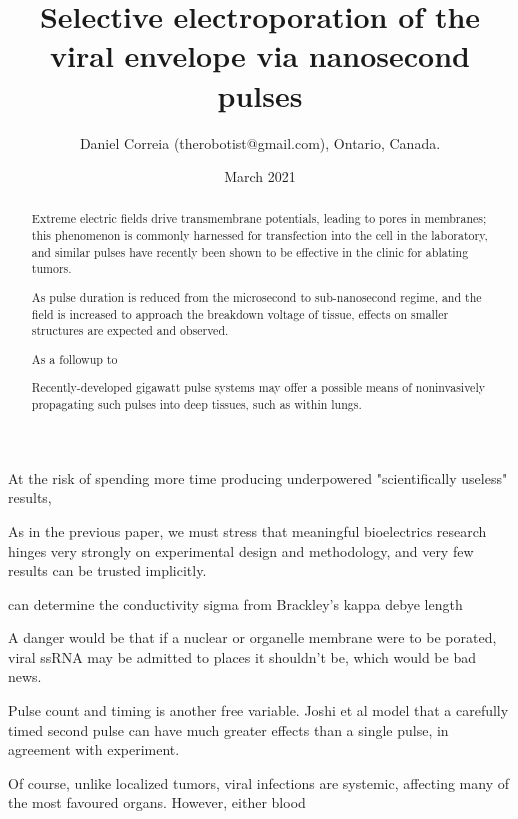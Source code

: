\documentclass[paper.tex]{subfiles}
\begin{document}
\title{Selective electroporation of the viral envelope via nanosecond pulses}
\author{\small{Daniel Correia (therobotist@gmail.com), Ontario, Canada.}}
\date{March 2021}

\flushbottom 
\maketitle
\thispagestyle{empty}

\renewcommand{\abstractname}{Summary}    %



\begin{abstract}
	Extreme electric fields drive transmembrane potentials, leading to pores in membranes; this phenomenon is commonly harnessed for transfection into the cell in the laboratory, and similar pulses have recently been shown to be effective in the clinic for ablating tumors. 
	
	As pulse duration is reduced from the microsecond to sub-nanosecond regime, and the field is increased to approach the breakdown voltage of tissue, effects on smaller structures are expected and observed. 
	
	As a followup to 
	
	Recently-developed gigawatt pulse systems may offer a possible means of noninvasively propagating such pulses into deep tissues, such as within lungs. 
\end{abstract}

At the risk of spending more time producing underpowered "scientifically useless" results, 

As in the previous paper, we must stress that meaningful bioelectrics research hinges very strongly on experimental design and methodology, and very few results can be trusted implicitly.



can determine the conductivity sigma from Brackley's kappa debye length

A danger would be that if a nuclear or organelle membrane were to be porated, viral ssRNA may be admitted to places it shouldn't be, which would be bad news. 

Pulse count and timing is another free variable. Joshi et al \cite{Selfconsistent2001} model that a carefully timed second pulse can have much greater effects than a single pulse, in agreement with experiment.

Of course, unlike localized tumors, viral infections are systemic, affecting many of the most favoured organs. However, either blood 
\end{document}
